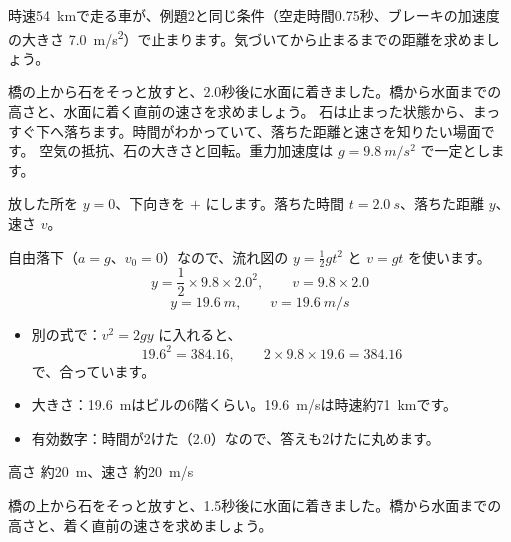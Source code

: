 \begin{jibun}
時速\qty{54}{km}で走る車が、例題2と同じ条件（空走時間0.75秒、ブレーキの加速度の大きさ \qty{7.0}{m/s^2}）で止まります。気づいてから止まるまでの距離を求めましょう。
\end{jibun}

\begin{phreidai}[橋から石を落とす]
\label{ph:力-1:ex3}橋の上から石をそっと放すと、2.0秒後に水面に着きました。橋から水面までの高さと、水面に着く直前の速さを求めましょう。
\phbamen
石は止まった状態から、まっすぐ下へ落ちます。時間がわかっていて、落ちた距離と速さを知りたい場面です。
\phmushi
空気の抵抗、石の大きさと回転。重力加速度は $g=\qty{9.8}{m/s^2}$ で一定とします。
\phzu
\noindent\begin{minipage}[c]{0.42\linewidth}\centering
{}
\end{minipage}\hfill
\begin{minipage}[c]{0.55\linewidth}
放した所を $y=0$、下向きを $+$ にします。落ちた時間 $t=\qty{2.0}{s}$、落ちた距離 $y$、速さ $v$。
\end{minipage}
\phriyu
自由落下（$a=g$、$v_0=0$）なので、流れ図の $y=\tfrac{1}{2}gt^2$ と $v=gt$ を使います。
\phtateru
\[ y=\frac{1}{2}\times9.8\times2.0^2,\qquad v=9.8\times2.0 \]
\phtoku
\[ y=\qty{19.6}{m},\qquad v=\qty{19.6}{m/s} \]
\phtashikame
\begin{itemize}[leftmargin=1.2\zw, itemsep=1pt, topsep=1pt, label={\color{bkTheme}●}]
\item 別の式で：$v^2=2gy$ に入れると、
\[ 19.6^2=384.16,\qquad 2\times9.8\times19.6=384.16 \]
で、合っています。
\item 大きさ：\qty{19.6}{m}はビルの6階くらい。\qty{19.6}{m/s}は時速約\qty{71}{km}です。
\item 有効数字：時間が2けた（2.0）なので、答えも2けたに丸めます。
\end{itemize}
\kotae 高さ 約\qty{20}{m}、速さ 約\qty{20}{m/s}
\end{phreidai}
\begin{jibun}
橋の上から石をそっと放すと、1.5秒後に水面に着きました。橋から水面までの高さと、着く直前の速さを求めましょう。
\end{jibun}

